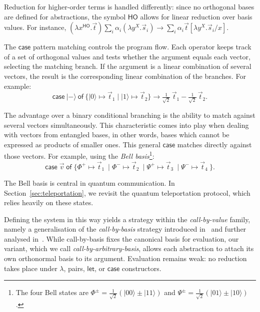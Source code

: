 \documentclass[a4paper,UKenglish,numberwithinsect,pdfa,anonymous]{lipics-v2021}
\theoremstyle{restatestyle}
\newcommand\ket[1]{\ensuremath{|#1\rangle}}
\newcommand\lra{\longrightarrow}
\newcommand\AbsBasis{\ensuremath{\mathsf{H\!O}}}
\def\Lam#1#2#3{\lambda#1^{#2}{.}#3} %
\def\case#1#2#3#4#5{\ensuremath{\mathsf{case}~#1~\mathsf{of}~\{#2\mapsto #4 \mid #3\mapsto #5\}}}
\def\sqrthalf{{\textstyle\frac{1}{\sqrt{2}}}}
\begin{document}
Reduction for higher-order terms is handled differently: since no orthogonal bases
are defined for abstractions, the symbol $\AbsBasis$ allows for linear reduction
over basis values. For instance, 
$(\Lam{x}{\AbsBasis}{\vec t}) \sum_i
\alpha_i(\Lam{y}{X}{\vec{s}_{i}}) \lra \sum_i\alpha_i\vec
t[\Lam{y}{X}{\vec{s}_{i}}/x]$.

The $\mathsf{case}$ pattern matching controls the program flow.  
Each operator keeps track of a set of orthogonal values and tests whether the
argument equals each vector, selecting the matching branch.  
If the argument is a linear combination of several vectors, the result is the
corresponding linear combination of the branches.  For example:
\[
  \case{\ket{-}}{\ket{0}}{\ket{1}}{\vec{t}_{1}}{\vec{t}_{2}} \lra
  \tfrac{1}{\sqrt{2}}\,\vec{t}_{1} - \tfrac{1}{\sqrt{2}}\,\vec{t}_{2}.
\]

The advantage over a binary conditional branching is the ability to match against
several vectors simultaneously. This characteristic comes into play when dealing
with vectors from entangled bases, in other words, bases which cannot be expressed
as products of smaller ones.  This general $\mathsf{case}$ matches directly
against those vectors.  For example, using the \emph{Bell basis}\footnote{ The four 
Bell states are $\Phi^{\pm}=\sqrthalf(\ket{00}\pm\ket{11})$ and $\Psi^{\pm}=
\sqrthalf(\ket{01}\pm\ket{10})$.}:
\[
  \mathsf{case}\;\vec{v}\;\mathsf{of}\;\{
  \Phi^+ \mapsto \vec{t}_{1}\ \mid
  \Phi^- \mapsto \vec{t}_{2}\ \mid
  \Psi^+ \mapsto \vec{t}_{3}\ \mid
  \Psi^- \mapsto \vec{t}_{4}\ \}.
\]

The Bell basis is central in quantum communication. In
Section~\ref{sec:teleportation}, we revisit the quantum teleportation protocol,
which relies heavily on these states.

Defining the system in this way yields a strategy within the
\emph{call-by-value} family, namely a generalisation of the
\emph{call-by-basis} strategy introduced in~\cite{ArrighiDowekLMCS17} and
further analysed in~\cite{AssafDiazcaroPerdrixTassonValironLMCS14}. While
call-by-basis fixes the canonical basis for evaluation, our variant,
which we call \emph{call-by-arbitrary-basis}, allows each abstraction to attach
its own orthonormal basis to its argument. Evaluation remains weak: no
reduction takes place under $\lambda$, pairs, $\mathsf{let}$, or
$\mathsf{case}$ constructors.
\end{document}
